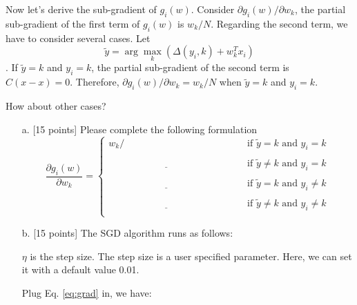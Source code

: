 Now let's derive the sub-gradient of $g_i(w)$.
Consider $\partial g_i(w)/ \partial w_k$, the partial sub-gradient of the first term of $g_i(w)$ is $w_k/N$.
Regarding the second term, we have to consider several cases. 
Let $$\tilde{y} = \arg\max_k \left(\Delta(y_i, k)+w^T_k x_i\right)$$. If $\tilde{y} = k$ and $y_i = k$, the partial sub-gradient of the second term is $C(x - x) = 0$. Therefore, 
$\partial g_i(w)/ \partial w_k = w_k/N$ when $\tilde{y} = k$ and $y_i = k$. 

How about other cases?

\begin{enumerate}
\item [a.] {[15 points]} Please complete the following formulation
\begin{equation}
\label{eq:grad}
\frac{\partial g_i(w)}{\partial w_k} = \begin{cases}
w_k/     \hspace{5cm} & \mbox{if } \tilde{y} = k \mbox{ and } y_i = k\\
\\
       \underline{\hspace{5cm}} &\mbox{if } \tilde{y} \neq k \mbox{ and } y_i = k\\
       \\
       \underline{\hspace{5cm}}  &\mbox{if } \tilde{y} = k \mbox{ and } y_i \neq k\\
       \\
        \underline{\hspace{5cm}} &\mbox{if } \tilde{y} \neq k \mbox{ and } y_i \neq k\\
\end{cases}
\end{equation}
\item [b.]  {[15 points]} The SGD algorithm runs as follows:  

\begin{algorithmic}
\STATE {}
\ENDFOR
\ENDFOR
\ENDFOR
\end{algorithmic}
$\eta$ is the step size. The step size is a user specified parameter. Here, we can set it with a default value 0.01.


Plug Eq. \eqref{eq:grad} in, we have:
\begin{algorithmic}
\STATE {}
\STATE
   

\end{algorithmic}
\end{enumerate}
